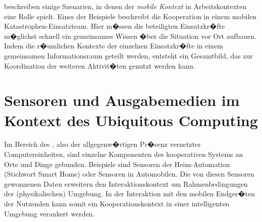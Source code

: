 \citet{Pei2012} beschreiben einige Szenarien, in denen der  \emph{mobile Kontext} in Arbeitskontexten eine Rolle spielt. Eines der Beispiele beschreibt die Kooperation in einem mobilen Katastrophen-Einsatzteam. Hier m�ssen die beteiligten Einsatzkr�fte m�glichst schnell ein gemeinsames Wissen �ber die Situation vor Ort aufbauen. Indem die r�umlichen Kontexte der einzelnen Einsatzkr�fte in einem gemeinsamen Informationsraum geteilt werden, entsteht ein Gesamtbild, das zur Koordination der weiteren Aktivit�ten genutzt werden kann.



\begin{comment}
yyy
Meercat / Periscope sind eine Live Sreaeming App, die mit Twitter verbunden ist und Videos in Echtzeit aufzeichnet, �bertr�gt und via Twitter andere Nutzer teilhaben l�sst. W�hrend eine 
Gespr�che der Teilnehmer werden im unteren Teil des Videostreams angezeigt. 
\randnotiz{\video Instantly stream your life with Meerkat: \url{https://youtu.be/FlFmpRqkfMA}}




\end{comment}

\section{Sensoren und Ausgabemedien im Kontext des Ubiquitous Computing}

Im Bereich des , also der allgegenw�rtigen Pr�senz vernetzter Computereinheiten, sind einzelne Komponenten des kooperativen Systems an Orte und Dinge gebunden. Beispiele sind Sensoren der Heim-Automation (Stichwort Smart Home) oder Sensoren in Automobilen. Die von diesen Sensoren gewonnenen Daten erweitern den Interaktionskontext um Rahmenbedingungen der (physikalischen) Umgebung. In der Interaktion mit den mobilen Endger�ten der Nutzenden kann somit ein Kooperationskontext in einer intelligenten Umgebung verankert werden. 



